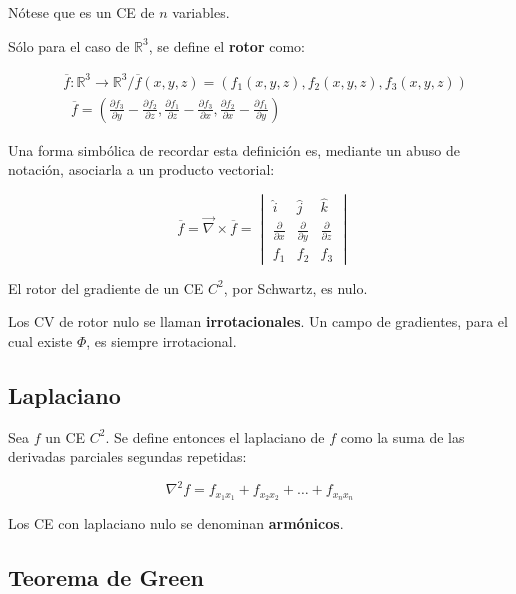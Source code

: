 \documentclass{article}
\renewcommand{\Bbb}{\mathbb}
\begin{document}
Nótese que es un CE de $n$ variables.

Sólo para el caso de $\Bbb R^3$, se define el \textbf{rotor} como:

\begin{align}
&\overline{f}:\Bbb R^3 \rightarrow \Bbb R^3 / \overline{f}(x,y,z) = (f_1(x,y,z), f_2(x,y,z), f_3(x,y,z)) \\
&\mathop{\overline{rot}} \overline{f} = \left( \frac{\partial f_3}{\partial y} - \frac{\partial f_2}{\partial z}, \frac{\partial f_1}{\partial z} - \frac{\partial f_3}{\partial x}, \frac{\partial f_2}{\partial x} - \frac{\partial f_1}{\partial y}  \right)
\end{align}

Una forma simbólica de recordar esta definición es, mediante un abuso de notación, asociarla a un producto vectorial:

\begin{equation}
\mathop{\overline{rot}} \overline{f} = \overrightarrow{\nabla} \times \overline{f} = \begin{vmatrix}
\hat{i} & \hat{j} & \hat{k} \\
\frac{\partial}{\partial x} & \frac{\partial}{\partial y} & \frac{\partial}{\partial z} \\
f_1 & f_2 & f_3
\end{vmatrix}
\end{equation}

El rotor del gradiente de un CE $C^2$, por Schwartz, es nulo.

Los CV de rotor nulo se llaman \textbf{irrotacionales}. Un campo de gradientes, para el cual existe $\Phi$, es siempre irrotacional.

\subsection{Laplaciano}

Sea $f$ un CE $C^2$. Se define entonces el laplaciano de $f$ como la suma de las derivadas parciales segundas repetidas:

\begin{equation}
\nabla^2 f = f_{x_1 x_1} + f_{x_2 x_2} + \ldots + f_{x_n x_n}
\end{equation}

Los CE con laplaciano nulo se denominan \textbf{armónicos}.

\subsection{Teorema de Green}
\end{document}
